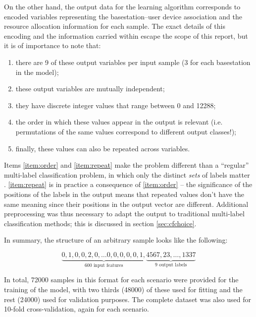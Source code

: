 \documentclass{kthreport}
\theoremstyle{definition}
\begin{document}
On the other hand, the output data for the learning algorithm corresponds to encoded variables representing the basestation--user device association and the resource allocation information for each sample. The exact details of this encoding and the information carried within escape the scope of this report, but it is of importance to note that:
\begin{enumerate}
	\item there are \num{9} of these output variables per input sample (\num{3} for each basestation in the model);
	\item these output variables are mutually independent;
	\item they have discrete integer values that range between \num{0} and \num{12288};
	\item the order in which these values appear in the output is relevant (i.e. permutations of the same values correspond to different output classes!);\label{item:order}
    \item finally, these values can also be repeated across variables.\label{item:repeat}
\end{enumerate} 

Items \ref{item:order} and \ref{item:repeat} make the problem different than a ``regular'' multi-label classification problem, in which only the distinct \emph{sets} of labels matter \autocite{tsoumakas2006multi}. \ref{item:repeat} is in practice a consequence of \ref{item:order} -- the significance of the positions of the labels in the output means that repeated values don't have the same meaning since their positions in the output vector are different.
Additional preprocessing was thus necessary to adapt the output to traditional multi-label classification methods; this is discussed in section \ref{sec:cfchoice}.

In summary, the structure of an arbitrary sample looks like the following:

\begin{equation}
\underbrace{0, 1, 0, 0, 2, 0, \ldots 0, 0, 0, 0, 0, 1,}_{\text{600 input features}}\underbrace{4567, 23, \ldots , 1337}_{\text{9 output labels}}
\end{equation}

In total, \num{72000} samples in this format for each scenario were provided for the training of the model, with two thirds (\num{48000}) of these used for fitting and the rest (\num{24000}) used for validation purposes. The complete dataset was also used for \num{10}-fold cross-validation, again for each scenario.
\end{document}
